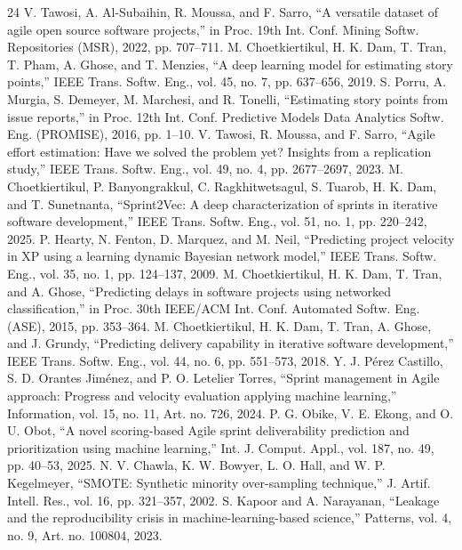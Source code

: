 \documentclass[conference]{IEEEtran}
\begin{document}
\begin{thebibliography}{24}
 V. Tawosi, A. Al-Subaihin, R. Moussa, and F. Sarro, ``A versatile dataset of agile open source software projects,'' in Proc. 19th Int. Conf. Mining Softw. Repositories (MSR), 2022, pp. 707--711.
 M. Choetkiertikul, H. K. Dam, T. Tran, T. Pham, A. Ghose, and T. Menzies, ``A deep learning model for estimating story points,'' IEEE Trans. Softw. Eng., vol. 45, no. 7, pp. 637--656, 2019.
 S. Porru, A. Murgia, S. Demeyer, M. Marchesi, and R. Tonelli, ``Estimating story points from issue reports,'' in Proc. 12th Int. Conf. Predictive Models Data Analytics Softw. Eng. (PROMISE), 2016, pp. 1--10.
 V. Tawosi, R. Moussa, and F. Sarro, ``Agile effort estimation: Have we solved the problem yet? Insights from a replication study,'' IEEE Trans. Softw. Eng., vol. 49, no. 4, pp. 2677--2697, 2023.
 M. Choetkiertikul, P. Banyongrakkul, C. Ragkhitwetsagul, S. Tuarob, H. K. Dam, and T. Sunetnanta, ``Sprint2Vec: A deep characterization of sprints in iterative software development,'' IEEE Trans. Softw. Eng., vol. 51, no. 1, pp. 220--242, 2025.
 P. Hearty, N. Fenton, D. Marquez, and M. Neil, ``Predicting project velocity in XP using a learning dynamic Bayesian network model,'' IEEE Trans. Softw. Eng., vol. 35, no. 1, pp. 124--137, 2009.
 M. Choetkiertikul, H. K. Dam, T. Tran, and A. Ghose, ``Predicting delays in software projects using networked classification,'' in Proc. 30th IEEE/ACM Int. Conf. Automated Softw. Eng. (ASE), 2015, pp. 353--364.
 M. Choetkiertikul, H. K. Dam, T. Tran, A. Ghose, and J. Grundy, ``Predicting delivery capability in iterative software development,'' IEEE Trans. Softw. Eng., vol. 44, no. 6, pp. 551--573, 2018.
 Y. J. Pérez Castillo, S. D. Orantes Jiménez, and P. O. Letelier Torres, ``Sprint management in Agile approach: Progress and velocity evaluation applying machine learning,'' Information, vol. 15, no. 11, Art. no. 726, 2024.
 P. G. Obike, V. E. Ekong, and O. U. Obot, ``A novel scoring-based Agile sprint deliverability prediction and prioritization using machine learning,'' Int. J. Comput. Appl., vol. 187, no. 49, pp. 40--53, 2025.
 N. V. Chawla, K. W. Bowyer, L. O. Hall, and W. P. Kegelmeyer, ``SMOTE: Synthetic minority over-sampling technique,'' J. Artif. Intell. Res., vol. 16, pp. 321--357, 2002.
 S. Kapoor and A. Narayanan, ``Leakage and the reproducibility crisis in machine-learning-based science,'' Patterns, vol. 4, no. 9, Art. no. 100804, 2023.

\end{thebibliography}
\end{document}
